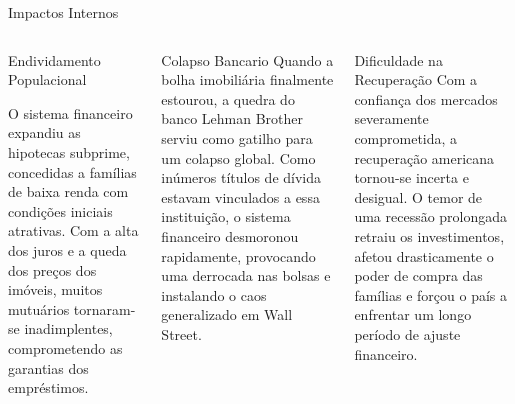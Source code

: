\documentclass[aspectratio=169, 12pt]{beamer}
\begin{document}
\begin{frame}{Impactos Internos}
\begin{columns}[T,onlytextwidth]


\begin{block}{Endividamento Populacional}
  
\scriptsize
O sistema financeiro expandiu as hipotecas subprime, concedidas a famílias de baixa renda com condições iniciais atrativas. Com a alta dos juros e a queda dos preços dos imóveis, muitos mutuários tornaram-se inadimplentes, comprometendo as garantias dos empréstimos.
\end{block}

\begin{alertblock}{Colapso Bancario}
\scriptsize
Quando a bolha imobiliária finalmente estourou, a quedra do  banco Lehman Brother serviu como gatilho para um colapso global. Como inúmeros títulos de dívida estavam vinculados a essa instituição, o sistema financeiro desmoronou rapidamente, provocando uma derrocada nas bolsas e instalando o caos generalizado em Wall Street.
\end{alertblock}

\begin{block}{Dificuldade na Recuperação}
\scriptsize
Com a confiança dos mercados severamente comprometida, a recuperação americana tornou-se incerta e desigual. O temor de uma recessão prolongada retraiu os investimentos, afetou drasticamente o poder de compra das famílias e forçou o país a enfrentar um longo período de ajuste financeiro.
\end{block}
\end{columns}
\end{frame}
\end{document}
